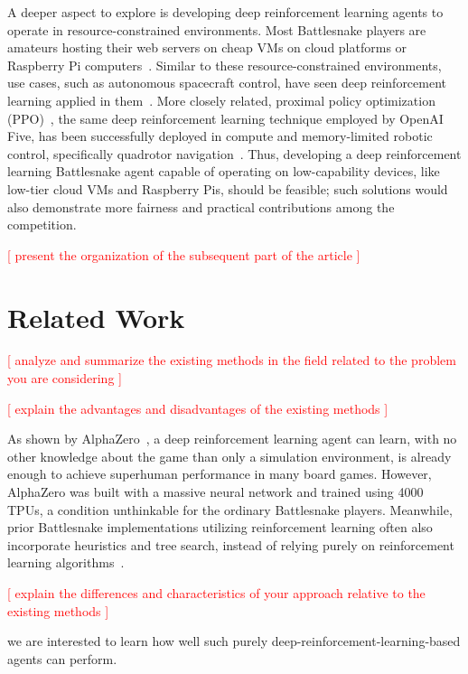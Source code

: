 \documentclass[conference]{IEEEtran}
\newcommand{\todo}[1]{\textcolor{red}{[ #1 ]}}
\begin{document}
A deeper aspect to explore is developing deep reinforcement learning agents to
operate in resource-constrained environments.
Most Battlesnake players are amateurs hosting their web servers on cheap VMs on
cloud platforms or Raspberry Pi computers~\cite{standard_leaderboard}.
Similar to these resource-constrained environments, use cases,
such as autonomous spacecraft control,
have seen deep reinforcement learning applied in
them~\cite{harris2022generation}. More closely related,
proximal policy optimization (PPO)~\cite{schulman2017proximal},
the same deep reinforcement learning technique employed by OpenAI Five,
has been successfully deployed in compute and memory-limited robotic control,
specifically quadrotor navigation~\cite{huang2023collision,hegde2023hyperppo}.
Thus,
developing a deep reinforcement learning Battlesnake agent capable of operating
on low-capability devices, like low-tier cloud VMs and Raspberry Pis,
should be feasible;
such solutions would also demonstrate more fairness and practical contributions
among the competition.

\todo{present the organization of the subsequent part of the article}

\section{Related Work}

\todo{analyze and summarize the existing methods in the field related to the
    problem you are considering
}

\todo{explain the advantages and disadvantages of the existing methods}

As shown by AlphaZero~\cite{silver2017mastering},
a deep reinforcement learning agent can learn,
with no other knowledge about the game than only a simulation environment,
is already enough to achieve superhuman performance in many board games.
However,
AlphaZero was built with a massive neural network and trained using 4000 TPUs,
a condition unthinkable for the ordinary Battlesnake players. Meanwhile,
prior Battlesnake implementations utilizing reinforcement learning often also
incorporate heuristics and tree search,
instead of relying purely on reinforcement learning
algorithms~\cite{chung2020battlesnake,binnersley2020battlesnake}.

\todo{explain the differences and characteristics of your approach relative to
    the existing methods
}

we are interested to learn how well such purely
deep-reinforcement-learning-based agents can perform.
\end{document}
